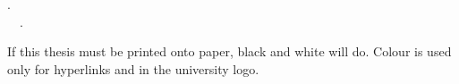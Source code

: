 \vspace*{\fill}

\begin{information}

\thetitle. \\
\textcopyright~\theyear~\theauthor.


If this thesis must be printed onto paper, black and white will do.
Colour is used only for hyperlinks and in the university logo.

\end{information}

\vspace{5em}
